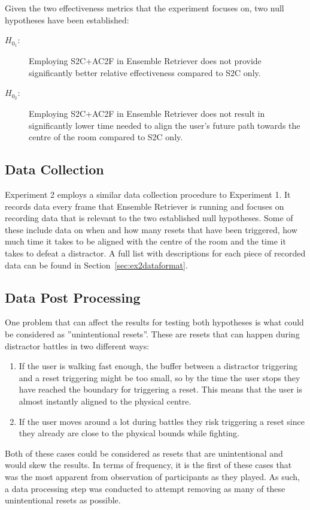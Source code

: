 Given the two effectiveness metrics that the experiment focuses on, two null hypotheses have been established:
\begin{description}
  \item[$H_{0_1}$:] Employing S2C+AC2F in Ensemble Retriever does not provide significantly better relative effectiveness compared to S2C only. 
  \item[$H_{0_2}$:] Employing S2C+AC2F in Ensemble Retriever does not result in significantly lower time needed to align the user's future path towards the centre of the room compared to S2C only.
\end{description}


\subsection{Data Collection}
Experiment 2 employs a similar data collection procedure to Experiment 1. It records data every frame that Ensemble Retriever is running and focuses on recording data that is relevant to the two established null hypotheses. Some of these include data on when and how many resets that have been triggered, how much time it takes to be aligned with the centre of the room and the time it takes to defeat a distractor. A full list with descriptions for each piece of recorded data can be found in Section~\ref{sec:ex2dataformat}. 

\subsection{Data Post Processing}\label{sec:ex2postprocessing}
One problem that can affect the results for testing both hypotheses is what could be considered as ''unintentional resets''. These are resets that can happen during distractor battles in two different ways:
\begin{enumerate}
    \item If the user is walking fast enough, the buffer between a distractor triggering and a reset triggering might be too small, so by the time the user stops they have reached the boundary for triggering a reset. This means that the user is almost instantly aligned to the physical centre. 
    \item If the user moves around a lot during battles they risk triggering a reset since they already are close to the physical bounds while fighting. 
\end{enumerate}

Both of these cases could be considered as resets that are unintentional and would skew the results. In terms of frequency, it is the first of these cases that was the most apparent from observation of participants as they played. As such, a data processing step was conducted to attempt removing as many of these unintentional resets as possible. 

